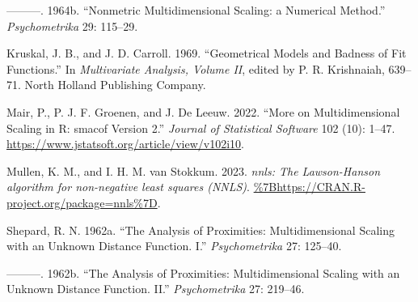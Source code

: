 \documentclass[
  12pt,
]{article}
\newlength{\cslhangindent}
\newenvironment{CSLReferences}[2] %
 {\begin{list}{}{%
  \setlength{\itemindent}{0pt}
  \setlength{\leftmargin}{0pt}
  \setlength{\parsep}{0pt}
  \ifodd #1
   \setlength{\leftmargin}{\cslhangindent}
   \setlength{\itemindent}{-1\cslhangindent}
  \fi
  \setlength{\itemsep}{#2\baselineskip}}}
 {\end{list}}
\begin{document}
\begin{CSLReferences}{1}{0}
---------. 1964b. {``{Nonmetric Multidimensional Scaling: a Numerical Method}.''} \emph{Psychometrika} 29: 115--29.

Kruskal, J. B., and J. D. Carroll. 1969. {``{Geometrical Models and Badness of Fit Functions}.''} In \emph{Multivariate Analysis, Volume II}, edited by P. R. Krishnaiah, 639--71. North Holland Publishing Company.

Mair, P., P. J. F. Groenen, and J. De Leeuw. 2022. {``{More on Multidimensional Scaling in R: smacof Version 2}.''} \emph{Journal of Statistical Software} 102 (10): 1--47. \url{https://www.jstatsoft.org/article/view/v102i10}.

Mullen, K. M., and I. H. M. van Stokkum. 2023. \emph{{nnls: The Lawson-Hanson algorithm for non-negative least squares (NNLS)}}. \url{\%7Bhttps://CRAN.R-project.org/package=nnls\%7D}.

Shepard, R. N. 1962a. {``{The Analysis of Proximities: Multidimensional Scaling with an Unknown Distance Function. I}.''} \emph{Psychometrika} 27: 125--40.

---------. 1962b. {``{The Analysis of Proximities: Multidimensional Scaling with an Unknown Distance Function. II}.''} \emph{Psychometrika} 27: 219--46.

\end{CSLReferences}
\end{document}
